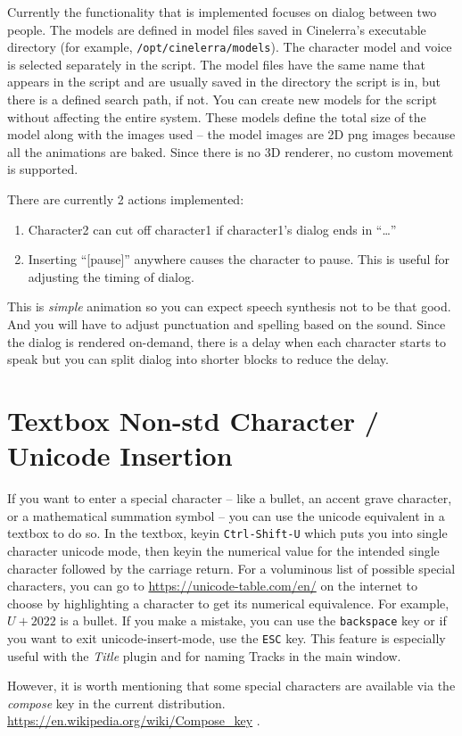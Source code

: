 Currently the functionality that is implemented focuses on dialog between two people.  The models are defined in model files saved in Cinelerra's executable directory (for example, \texttt{/opt/cinelerra/models}).  The character model and voice is selected separately in the script.  The model files have the same name that appears in the script and are usually saved in the directory the script is in, but there is a defined search path, if not.  You can create new models for the script without affecting the entire system.  These models define the total size of the model along with the images used -- the model images are 2D png images because all the animations are baked.  Since there is no 3D renderer, no custom movement is supported.

There are currently 2 actions implemented:

\begin{enumerate}
    \item Character2 can cut off character1 if character1's dialog ends in “\dots”
    \item Inserting “[pause]” anywhere causes the character to pause.  This is useful for adjusting the timing of dialog.
\end{enumerate}

This is \textit{simple} animation so you can expect speech synthesis not to be that good.  And you will have to adjust punctuation and spelling based on the sound.  Since the dialog is rendered on-demand, there is a delay when each character starts to speak but you can split dialog into shorter blocks to reduce the delay.

\section{Textbox Non-std Character / Unicode Insertion}%
\label{sec:textbox_non_std_character_unicode}

If you want to enter a special character -- like a bullet, an accent grave character, or a mathematical summation symbol -- you can use the unicode equivalent in a textbox to do so.  In the textbox, keyin \texttt{Ctrl-Shift-U} which puts you into single character unicode mode, then keyin the numerical value for the intended single character followed by the carriage return.  For a voluminous list of possible special characters, you can go to \url{https://unicode-table.com/en/} on the internet to choose by highlighting a character to get its numerical equivalence.  For example, $U+2022$ is a bullet.  If you make a mistake, you can use the \texttt{backspace} key or if you want to exit unicode-insert-mode, use the \texttt{ESC} key.  This feature is especially useful with the \textit{Title} plugin and for naming Tracks in the main window.

However, it is worth mentioning that some special characters are available via the \textit{compose} key in the current distribution. \url{https://en.wikipedia.org/wiki/Compose_key} .

